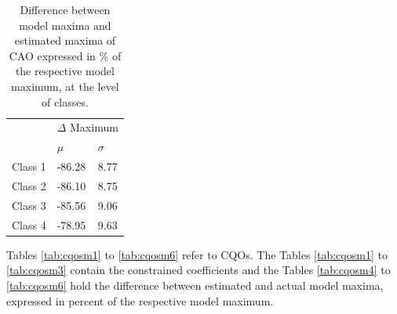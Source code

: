 			\vspace{10em}
		
			\begin{table}[h!]	
			
				\normalsize
				\caption{Difference between model maxima and estimated maxima of CAO expressed in \% of the respective model maximum, at the level of classes.}
				\centering
			
				\begin{tabular}{@{}lll@{}}
					\toprule
					& \multicolumn{2}{c}{$\Delta$ Maximum} \\ \cmidrule{2-3}
					& $\mu$   & $\sigma$   \\
					\hline
					Class 1 & -86.28 & 8.77 \\
					Class 2 & -86.10 & 8.75 \\
					Class 3 & -85.56 & 9.06 \\
					Class 4 & -78.95 & 9.63 \\
					\toprule
				\end{tabular}
			
			\label{tab:caosm4}
		
		\end{table}
			
			\vspace{15em}
			
		
		Tables \ref{tab:cqosm1} to \ref{tab:cqosm6} refer to CQOs.
		The Tables \ref{tab:cqosm1} to \ref{tab:cqosm3} contain the constrained coefficients and the Tables \ref{tab:cqosm4} to \ref{tab:cqosm6} hold the difference between estimated and actual model maxima, expressed in percent of the respective model maximum.
		
